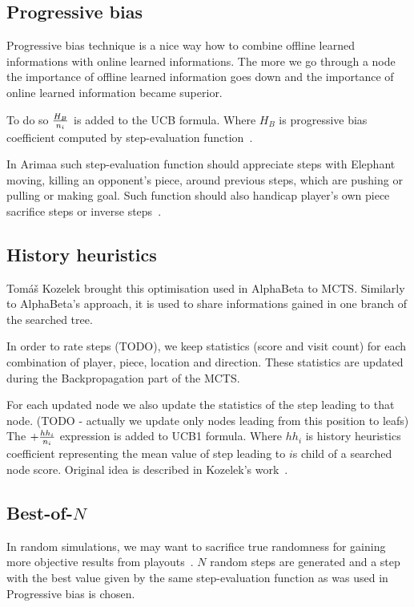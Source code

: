 \subsection{Progressive bias}
Progressive bias technique is a nice way how to combine offline learned
informations with online learned informations. The more we go through a node
the importance of offline learned information goes down and the importance of
online learned information became superior.

To do so ${H_B \over n_i}$ is added to the UCB formula. Where $H_B$ is
progressive bias coefficient computed by step-evaluation
function~\cite{progressive-strategies}.

In Arimaa such step-evaluation function should appreciate steps with Elephant
moving, killing an opponent's piece, around previous steps, which are pushing or
pulling or making goal. Such function should also handicap player's own piece
sacrifice steps or inverse steps~\cite{KOZELEK}.

\subsection{History heuristics}
Tomáš Kozelek brought this optimisation used in AlphaBeta to MCTS. Similarly to
AlphaBeta's approach, it is used to share informations gained in one branch of
the searched tree.

In order to rate steps (TODO), we keep statistics (score and visit count) for
each combination of player, piece, location and direction. These statistics are
updated during the Backpropagation part of the MCTS.

For each updated node we also update the statistics of the step leading to that
node. (TODO - actually we update only nodes leading from this position to leafs) The $+ {hh_i \over n_i}$ expression is added to UCB1 formula.
Where $hh_i$ is history heuristics coefficient representing the mean value of
step leading to $i$s child of a searched node score. Original idea is described
in Kozelek's work~\cite{KOZELEK}.

\subsection{Best-of-$N$}
In random simulations, we may want to sacrifice true randomness for gaining
more objective results from playouts~\cite{HeavyPlayouts}. $N$ random steps are
generated and a step with the best value given by the same step-evaluation
function as was used in Progressive bias is chosen.

